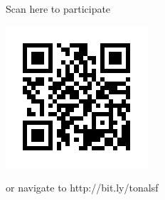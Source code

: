 \documentclass{article}
\begin{document}
	\centerline{\Huge{Scan here to participate}}	
	\includegraphics[width=\textwidth]{client-qr.png}
	\centerline{\Huge{or navigate to http://bit.ly/tonalsf}}
\end{document}
